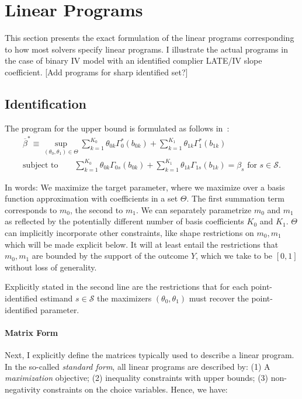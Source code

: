 \documentclass[12pt,a4paper,english]{article} %
\numberwithin{equation}{section}
\theoremstyle{definition}
\theoremstyle{remark}
\theoremstyle{plain}
\begin{document}
\clearpage
\newpage

\section{Linear Programs}\label{app_sec:linear_programs}
This section presents the exact formulation of the linear programs corresponding to how most solvers specify linear programs.
I illustrate the actual programs in the case of binary IV model with an identified complier LATE/IV slope coefficient.
[Add programs for sharp identified set?]

\subsection{Identification}

The program for the upper bound is formulated as follows in~\cite{mogstad2018using}:
\begin{align}
  \overline{\beta}^* \equiv \sup_{(\theta_0, \theta_1)\in\Theta} \sum_{k=1}^{K_0}\theta_{0k}\Gamma^*_0(b_{0k}) + \sum_{k=1}^{K_1}\theta_{1k}\Gamma^*_1(b_{1k}) \\
  \text{subject to} \qquad \sum_{k=1}^{K_0}\theta_{0k}\Gamma_{0s}(b_{0k}) + \sum_{k=1}^{K_1}\theta_{1k}\Gamma_{1s}(b_{1k}) = \beta_s \text{ for } s \in \mathcal{S}.
\end{align}

In words: We maximize the target parameter, where we maximize over a basis function approximation with coefficients in a set $\Theta$.
The first summation term corresponds to $m_0$, the second to $m_1$.
We can separately parametrize $m_0$ and $m_1$ as reflected by the potentially different number of basis coefficients $K_0$ and $K_1$.
$\Theta$ can implicitly incorporate other constraints, like shape restrictions on $m_0, m_1$ which will be made explicit below.
It will at least entail the restrictions that $m_0, m_1$ are bounded by the support of the outcome $Y$, which we take to be $[0,1]$ without loss of generality.

Explicitly stated in the second line are the restrictions that for each point-identified estimand $s\in\mathcal{S}$ the maximizers $(\theta_0, \theta_1)$ must recover the point-identified parameter.

\paragraph{Matrix Form}
Next, I explicitly define the matrices typically used to describe a linear program.
In the so-called \textit{standard form}, all linear programs are described by:
(1) A \textit{maximization} objective; (2) inequality constraints with upper bounds; (3) non-negativity constraints on the choice variables.
Hence, we have:
\end{document}
